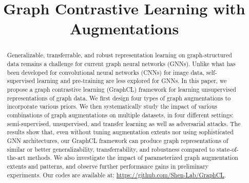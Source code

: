 \title{Graph Contrastive Learning with Augmentations}



\maketitle

\begin{abstract}

Generalizable, transferrable, and robust representation learning on graph-structured data remains a challenge for current graph neural networks (GNNs).  
Unlike what has been developed for convolutional neural networks (CNNs) for image data, self-supervised learning and pre-training are
less explored for GNNs.
In this paper, we propose a graph contrastive learning (GraphCL) framework
for learning unsupervised 
representations of graph data.
We first design four types of graph augmentations to incorporate various priors. We then systematically 
study the impact of
various combinations of graph augmentations on multiple datasets, in four different settings: semi-supervised, unsupervised, and transfer learning as well as adversarial attacks. The results show that, even without tuning augmentation extents nor using sophisticated GNN architectures, our GraphCL framework can produce graph representations of similar or better generalizability, transferrability, and robustness compared to state-of-the-art methods. We also investigate the impact of parameterized graph augmentation extents and patterns, and observe further performance gains in preliminary experiments. 
Our codes are available at: \url{https://github.com/Shen-Lab/GraphCL}.
\end{abstract}

\renewcommand{\thefootnote}{\fnsymbol{footnote}}
\renewcommand{\thefootnote}{\arabic{footnote}}

\vspace{-1em}
